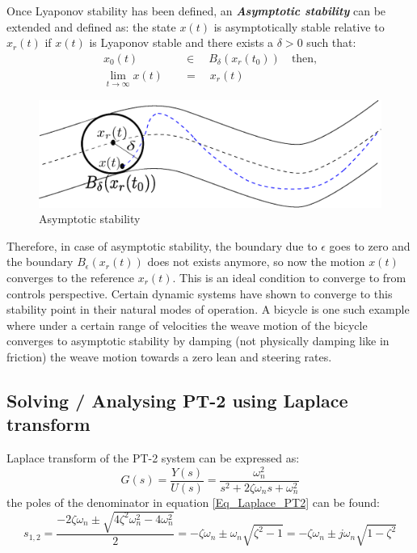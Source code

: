 Once Lyaponov stability has been defined, an \textbf{\textit{Asymptotic stability}} can be extended and defined as: the state $x(t)$ is asymptotically stable relative to $x_r(t)$ if $x(t)$ is Lyaponov stable and there exists a $\delta > 0$ such that:
\begin{align}
x_0(t) \quad &\in \quad B_{\delta}(x_r(t_0)) \quad \text{then,}\\
\lim_{t\to\infty} x(t) \quad &= \quad x_r(t)
\end{align}
\begin{figure}[h!]
	\centering
	\includegraphics[scale=0.5]{Bilder/AsymptoticStability.eps}
	\caption{Asymptotic stability}
	\label{fig:AsymptoticStability}
\end{figure}
Therefore, in case of asymptotic stability, the boundary due to $\epsilon$ goes to zero and the boundary $B_{\epsilon}(x_r(t))$ does not exists anymore, so now the motion $x(t)$ converges to the reference $x_r(t)$. This is an ideal condition to converge to from controls perspective. Certain dynamic systems have shown to converge to this stability point in their natural modes of operation. A bicycle is one such example where under a certain range of velocities the weave motion of the bicycle converges to asymptotic stability by damping (not physically damping like in friction) the weave motion towards a zero lean and steering rates. 

\subsection{Solving / Analysing PT-2 using Laplace transform} \label{Sec_Solving_PT2_Laplace}

Laplace transform of the PT-2 system can be expressed as:
\begin{equation}\label{Eq_Laplace_PT2}
G(s) = \frac{Y(s)}{U(s)} = \frac{\omega_{n}^{2}}{s^{2} + 2 \zeta \omega_{n} s + \omega_{n}^{2}}
\end{equation}
the poles of the denominator in equation \eqref{Eq_Laplace_PT2} can be found:
\begin{equation*}
s_{1,2} = \frac{-2 \zeta \omega_{n} \pm \sqrt{4 \zeta^{2} \omega_{n}^2 - 4 \omega_{n}^2}}{2} = -\zeta \omega_{n} \pm \omega_{n} \sqrt{\zeta^2 - 1} = -\zeta \omega_{n} \pm j \omega_{n} \sqrt{1 - \zeta^2}
\end{equation*}

